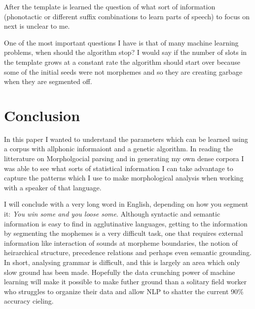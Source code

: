 \documentclass[runningheads,a4paper]{llncs}
\begin{document}
After the template is learned the question of what sort of information (phonotactic or  different suffix combinations to learn parts of speech) to focus on next is unclear to me. 

One of the most important questions I have is  that of many machine learning problems, when should the algorithm stop? I would say if the number of slots in the template grows at a constant rate the algorithm should start over because some of the initial seeds were not morphemes and so they are creating garbage when they are segmented off. 


\section{Conclusion}

In this paper I wanted to understand the parameters which can be learned using a corpus with allphonic informaiont and a genetic algorithm. In reading the litterature on Morpholgocial parsing and in generating my own dense corpora I was able to see what sorts of statistical information I can take advantage to capture the patterns which I use to make morphological analysis when working with a speaker of that language. 


I will conclude with a very long word in English, depending on how you segment it: \textit{You win some and you loose some}. Although syntactic and semantic information is easy to find in agglutinative languages, getting to the information by segmenting the mophemes is a very difficult task, one that requires external information like interaction of sounds at morpheme boundaries, the notion of heirarchical structure, precedence relations and perhaps even semantic grounding. In short, analysing grammar is difficult, and this is largely an area which only slow ground has been made. Hopefully the data crunching power of machine learning will make it possible to make futher ground than a solitary field worker who struggles to organize their data and allow NLP to shatter the current 90\% accuracy cieling.
\end{document}
